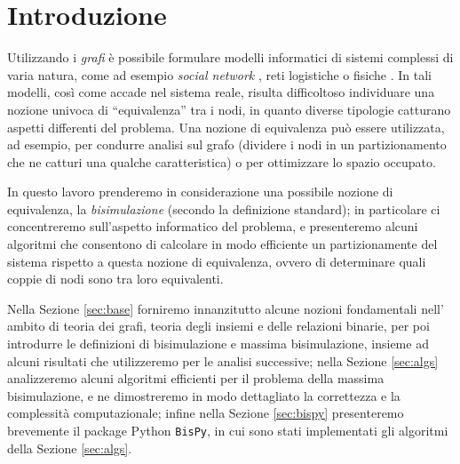 \section{Introduzione}
Utilizzando i \emph{grafi} è possibile formulare modelli informatici di sistemi complessi di varia natura, come ad esempio \emph{social network} \cite{twitter}, reti logistiche \cite{supply} o fisiche \cite{electric}. In tali modelli, così come accade nel sistema reale, risulta difficoltoso individuare una nozione univoca di ``equivalenza'' tra i nodi, in quanto diverse tipologie catturano aspetti differenti del problema. Una nozione di equivalenza può essere utilizzata, ad esempio, per condurre analisi sul grafo (dividere i nodi in un partizionamento che ne catturi una qualche caratteristica) o per ottimizzare lo spazio occupato.

In questo lavoro prenderemo in considerazione una possibile nozione di equivalenza, la \emph{bisimulazione} (secondo la definizione standard); in particolare ci concentreremo sull'aspetto informatico del problema, e presenteremo alcuni algoritmi che consentono di calcolare in modo efficiente un partizionamente del sistema rispetto a questa nozione di equivalenza, ovvero di determinare quali coppie di nodi sono tra loro equivalenti.

Nella Sezione \ref{sec:base} forniremo innanzitutto alcune nozioni fondamentali nell' ambito di teoria dei grafi, teoria degli insiemi e delle relazioni binarie, per poi introdurre le definizioni di bisimulazione e massima bisimulazione, insieme ad alcuni risultati che utilizzeremo per le analisi successive; nella Sezione \ref{sec:algs} analizzeremo alcuni algoritmi efficienti per il problema della massima bisimulazione, e ne dimostreremo in modo dettagliato la correttezza e la complessità computazionale; infine nella Sezione \ref{sec:bispy} presenteremo brevemente il package Python \texttt{BisPy}, in cui sono stati implementati gli algoritmi della Sezione \ref{sec:algs}.

